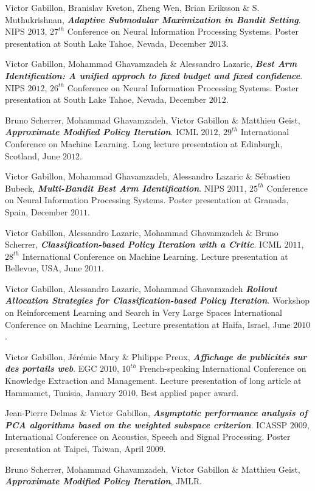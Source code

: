  Victor Gabillon, Branislav Kveton, Zheng Wen, Brian Eriksson $\&$ S. Muthukrishnan, \textbf{\emph{Adaptive Submodular Maximization in Bandit Setting}}.
NIPS $2013$, $27^{th}$ Conference on Neural Information Processing Systems.
Poster presentation at South Lake Tahoe, Nevada, December $2013$.


 Victor Gabillon, Mohammad Ghavamzadeh $\&$  Alessandro Lazaric, \textbf{\emph{Best Arm Identification: A unified approch to fixed budget and fixed confidence}}.
NIPS $2012$, $26^{th}$ Conference on Neural Information Processing Systems.
Poster presentation at South Lake Tahoe, Nevada, December $2012$.


 Bruno Scherrer, Mohammad Ghavamzadeh, Victor Gabillon $\&$ Matthieu Geist, \textbf{\emph{Approximate Modified Policy Iteration}}.
ICML $2012$, $29^{th}$  International Conference on Machine Learning.
Long lecture presentation at Edinburgh, Scotland, June $2012$.


 Victor Gabillon, Mohammad Ghavamzadeh, Alessandro Lazaric $\&$ Sébastien Bubeck, \textbf{\emph{Multi-Bandit Best Arm Identification}}.
NIPS $2011$, $25^{th}$ Conference on Neural Information Processing Systems.
Poster presentation at Granada, Spain, December $2011$.


 Victor Gabillon, Alessandro Lazaric, Mohammad Ghavamzadeh $\&$  Bruno Scherrer, \textbf{ \emph{Classification-based Policy Iteration with a Critic}}. ICML $2011$, $28^{th}$  International Conference on Machine Learning. Lecture presentation at Bellevue, USA, June $2011$.


 Victor Gabillon,  Alessandro Lazaric, Mohammad Ghavamzadeh \textbf{ \emph{Rollout Allocation Strategies for Classification-based Policy Iteration}}. Workshop on Reinforcement Learning and Search in Very Large Spaces International Conference on Machine Learning,  Lecture presentation at Haifa, Israel, June $2010$.


 Victor Gabillon, Jérémie Mary $\&$ Philippe Preux, \textbf{ \emph{Affichage de publicités sur des portails web}}. EGC $2010$, $10^{th}$ French-speaking International Conference on Knowledge Extraction and Management. Lecture presentation of long article at Hammamet, Tunisia, January $2010$. Best applied paper award.

 
 Jean-Pierre Delmas $\&$ Victor Gabillon,\textbf{ \emph{Asymptotic performance analysis of PCA algorithms based on the weighted subspace criterion}}.  ICASSP $2009$, International Conference on Acoustics, Speech and Signal Processing. Poster presentation at Taipei, Taiwan, April $2009$. 
   

  Bruno Scherrer, Mohammad Ghavamzadeh, Victor Gabillon $\&$ Matthieu Geist, \textbf{\emph{Approximate Modified Policy Iteration}}, JMLR.

